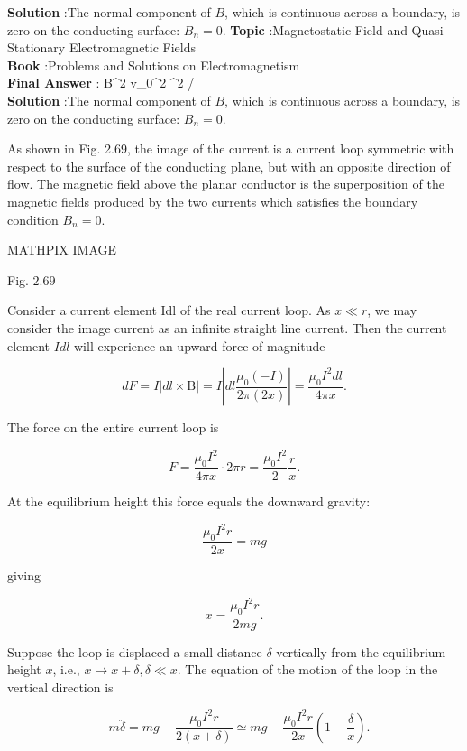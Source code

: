 \documentclass[10pt]{article}
\begin{document}
\textbf{Solution} :The normal component of $B$, which is continuous across a boundary, is zero on the conducting surface: $B_{n}=0$.
\textbf{Topic} :Magnetostatic Field and Quasi-Stationary Electromagnetic Fields\\
\textbf{Book} :Problems and Solutions on Electromagnetism\\
\textbf{Final Answer} : B^{2} v_{0}^{2} \sin ^{2} \alpha {} / \\


\textbf{Solution} :The normal component of $B$, which is continuous across a boundary, is zero on the conducting surface: $B_{n}=0$.

 As shown in Fig. 2.69, the image of the current is a current loop symmetric with respect to the surface of the conducting plane, but with an opposite direction of flow. The magnetic field above the planar conductor is the superposition of the magnetic fields produced by the two currents which satisfies the boundary condition $B_{n}=0$.

MATHPIX IMAGE

Fig. $2.69$

 Consider a current element Idl of the real current loop. As $x \ll r$, we may consider the image current as an infinite straight line current. Then the current element $I d l$ will experience an upward force of magnitude

$$
d F=I|d l \times \mathrm{B}|=I\left|d l \frac{\mu_{0}(-I)}{2 \pi(2 x)}\right|=\frac{\mu_{0} I^{2} d l}{4 \pi x} .
$$

The force on the entire current loop is

$$
F=\frac{\mu_{0} I^{2}}{4 \pi x} \cdot 2 \pi r=\frac{\mu_{0} I^{2}}{2} \frac{r}{x} .
$$



At the equilibrium height this force equals the downward gravity:

$$
\frac{\mu_{0} I^{2} r}{2 x}=m g
$$

giving

$$
x=\frac{\mu_{0} I^{2} r}{2 m g} .
$$

Suppose the loop is displaced a small distance $\delta$ vertically from the equilibrium height $x$, i.e., $x \rightarrow x+\delta, \delta \ll x$. The equation of the motion of the loop in the vertical direction is

$$
-m \ddot{\delta}=m g-\frac{\mu_{0} I^{2} r}{2(x+\delta)} \simeq m g-\frac{\mu_{0} I^{2} r}{2 x}\left(1-\frac{\delta}{x}\right) .
$$
\end{document}
